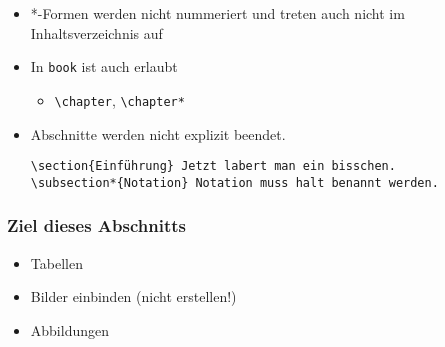 \begin{frame}[fragile]
\begin{itemize}
\begin{itemize}
        \item \lstinline!\paragraph!, \lstinline!\paragraph*!
        \item \lstinline!\subparagraph!, \lstinline!\subparagraph*!
      \end{itemize}
    \item<+-> *-Formen werden nicht nummeriert und treten auch nicht im
      Inhaltsverzeichnis auf
    \item<+-> In \lstinline|book| ist auch erlaubt
      \begin{itemize}
        \item \lstinline!\chapter!, \lstinline!\chapter*!
      \end{itemize}
    \item<+-> Abschnitte werden nicht explizit beendet.
\begin{lstlisting}
\section{Einführung} Jetzt labert man ein bisschen.
\subsection*{Notation} Notation muss halt benannt werden.
\end{lstlisting}
  \end{itemize}

\end{frame}


\begin{frame}
  \frametitle{Ziel dieses Abschnitts}

  \begin{itemize}
  \item Tabellen
  \item Bilder einbinden (nicht erstellen!)
  \item Abbildungen
  \end{itemize}

\end{frame}

